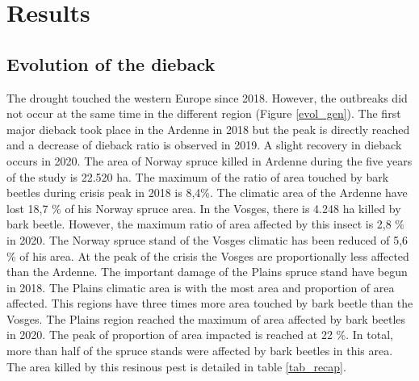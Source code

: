 \documentclass[3p,procedia]{elsarticle}
\begin{document}
\section{Results}




\subsection{Evolution of the dieback }

The drought touched the western Europe since 2018.
However, the outbreaks did not occur at the same time in the different region (Figure \ref{evol_gen}).
The first major dieback took place in the Ardenne in 2018 but the peak is directly reached and a decrease of dieback ratio is observed in 2019. 
A slight recovery in dieback occurs in 2020.
The area of Norway spruce killed in Ardenne during the five years of the study is 22.520 ha.
The maximum of the ratio of area touched by bark beetles during crisis peak in 2018 is 8,4\%. 
The climatic area of the Ardenne have lost 18,7 \% of his Norway spruce area.
In the Vosges, there is 4.248 ha killed by bark beetle.
However, the maximum ratio of area affected by this insect is 2,8 \% in 2020.
The Norway spruce stand of the Vosges climatic has been reduced of 5,6 \% of his area. 
At the peak of the crisis the Vosges are proportionally less affected than the Ardenne.
The important damage of the Plains spruce stand have begun in 2018.  
The Plains climatic area is  with the most area and proportion of area affected.
This regions have three times more area touched by bark beetle than the Vosges.
The Plains region reached the maximum of area affected by bark beetles in 2020. 
The peak of proportion of area impacted is reached at 22 \%.
In total, more than half of the spruce stands were affected by bark beetles in this area.
The area killed by this resinous pest is detailed in table \ref{tab_recap}.
\end{document}
